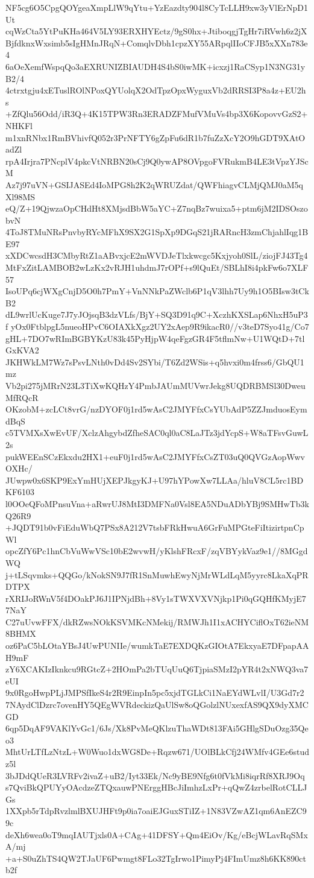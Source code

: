NF5cg6O5CpgQOYgeaXmpLlW9qYtu+YzEazdty904l8CyTcLLH9xw3yVlErNpD1Ut
cqWzCta5YtPuKHa464V5LY93ERXHYEctz/9gS0hx+JtiboqgjTgHr7iRVwh6z2jX
BjfdknxWxsimb5sIgHMnJRqN+ComqlvDbh1cpzXY55ARpqlIIoCFJB5xXXn783e4
6aOeXemfWspqQo3aEXRUNIZBIAUDH4S4bS0iwMK+icxzj1RaCSyp1N3NG31yB2/4
4ctrxtgju4xETuslROlNPoxQYUolqX2OdTpzOpxWyguxVb2dRRSI3P8a4z+EU2hs
+ZfQlu56Odd/iR3Q+4K15TPW3Rn3ERADZFMufVMuVs4bp3X6KopovvGzS2+NHKFl
m1xnRNbx1RmBVhivfQ052r3PrNFTY6gZpFu6dR1b7fuZzXcY2O9hGDT9XAtOadZl
rpA4Irjra7PNcplV4pkcVtNRBN20sCj9Q0ywAP8OVpgoFVRukmB4LE3tVpzYJScM
Az7j97uVN+GSIJASEd4IoMPG8h2K2qWRUZdat/QWFhiagvCLMjQMJ0aM5qXl98MS
eQ/Z+19QjwzaOpCHdHt8XMjsdBbW5aYC+Z7nqBz7wuixa5+ptm6jM2IDSOszobvN
4ToJ8TMuNRsPnvbyRYcMFhX9SX2G1SpXp9DGqS21jRARncH3zmChjahlIqg1BE97
xXDCwcsdH3CMbyRtZ1aABvxjcE2mWVDJeTlxkwcgc5Kxjyoh0SlL/ziojFJ43Tg4
MtFxZitLAMBOB2wLzKx2vRJH1uhdmJ7rOPf+s9lQuEt/SBLhI8i4pkFw6o7XLF57
IsoUPq6cjWXgCnjD5O0h7PmY+VnNNkPaZWclb6P1qV3lhh7Uy9h1O5BIsw3tCkB2
dL9wrlUcKuge7J7yJOjsqB3dzVLfs/BjY+SQ3D91q9C+XczhKXSLap6NhxH5uP3f
yOx0FtblpgL5nueoHPvC6OIAXkXgz2UY2xAep9R9ikacR0//v3teD7Syo41g/Co7
gHL+7DO7wRImBGBYKzU83k45PyHjpW4qeFgzGR4F5tflmNw+U1WQtD+7tlGxKVA2
JKHWkLM7Wz7sPsvLNth0vDd4Sv2SYbi/T6Zd2WSis+q5hvxi0m4frss6/GbQU1mz
Vb2pi275jMRrN23L3TiXwKQHzY4PmbJAUmMUVwrJekg8UQDRBMSl30DweuMfRQcR
OKzobM+zcLCt8vrG/nzDYOF0j1rd5wAsC2JMYFfxCsYUbAdP5ZZJmduosEymdBqS
c5TVMXsXwEvUF/XclzAhgybdZfheSAC0ql0aC8LaJTz3jdYcpS+W8aTFsvGuwL2s
pukWEEnSCzEkxdu2HX1+euF0j1rd5wAsC2JMYFfxCsZT03uQ0QVGzAopWwvOXHc/
JUwpw0x6SKP9ExYmHUjXEPJkgyKJ+U97hYPowXw7LLAa/hluV8CL5rc1BDKF6103
l0OOeQFoMPnsuVna+aRwrUJ8MtI3DMFNa0Vsl8EA5NDuADbYBj9SMHwTb3kQ26R9
+JQDT91b0vFiEduWbQ7PSx8A212V7tsbFRkHwuA6GrFuMPGteFiItizirtpnCpWl
opcZfY6Pc1hnCbVuWwVSc10bE2wvwH/yKlshFRcxF/zqVBYykVaz9e1//8MGgdWQ
j+tLSqvmks+QQGo/kNokSN9J7fR1SnMuwhEwyNjMrWLdLqM5yyrc8LkaXqPRDTPX
rXRIJoRWnV5f4DOakPJ6J1IPNjdBh+8Vy1sTWXVXVNjkp1Pi0qGQHfKMyjE77NaY
C27uUvwFFX/dkRZwsNOkKSVMKcNMekij/RMWJh1I1xACHYCiflOxT62ieNM8BHMX
oz6PaC5bLOtaYBsJ4UwPUNIIe/wumkTaE7EXDQKzGIOtA7EkxyaE7DFpapAAH9mF
zY6XCAKIzIknkcu9RGtcZ+2HOmPa2bTUqUuQ6TjpiaSMzI2pYR4t2xNWQ3va7eUI
9x0RgoHwpPLjJMPSfIkeS4r2R9EinpIn5pc5xjdTGLkCi1NaEYdWLvlI/U3Gd7r2
7NAydClDzrc7ovenHY5QEgWVRdeckizQaUlSw8oQGolzlNUxexfAS9QX9dyXMCGD
6qp5DqAF9VAKlYvGc1/6Js/Xk8PvMeQKlzuThaWDt813FAi5GHlgSDuOzg35Qeo3
MhtUrLTfLzNtzL+W0Wuo1dxWG8De+Rqzw671/UOlBLkCfj24WMfv4GEe6studz5l
3bJDdQUeR3LVRFv2ivaZ+uB2/Iyt33Ek/Nc9yBE9Nfg6t0fVkMi8iqrRf8XRJ9Oq
s7QviBkQPUYyOAcdzeZTQxauwPNErggHBcJiImhzLxPr+qQwZ4zrbelRotCLLJGs
1XXpb5rTdpRvzlmlBXUJHFt9p0ia7oaiEJGuxSTiIZ+1N83VZwAZ1qm6AnEZC99c
deXh6wea0oT9mqIAUTjxls0A+CAg+41DFSY+Qm4EiOv/Kg/eBcjWLavRqSMxA/mj
+a+S0uZhTS4QW2TJaUF6Pwmgt8FLo32TgIrwo1PimyPj4FImUmz8h6KK890ctb2f
